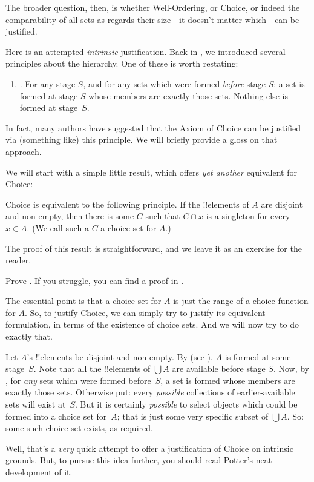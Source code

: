 \documentclass[../../../include/open-logic-section]{subfiles}
\begin{document}

The broader question, then, is whether Well-Ordering, or Choice, or
indeed the comparability of all sets as regards their size---it
doesn't matter which---can be justified. 

Here is an attempted \emph{intrinsic} justification. Back in
, we introduced several principles
about the hierarchy. One of these is worth restating:
\begin{enumerate}
	\item[] \stagesacc. For any stage $S$, and for any sets which were
	formed \emph{before} stage $S$: a set is formed at stage $S$ whose
	members are exactly those sets. Nothing else is formed at
	stage~$S$. 
\end{enumerate}
In fact, many authors have suggested that the Axiom of Choice can be
justified via (something like) this principle. We will briefly provide
a gloss on that approach.

We will start with a simple little result, which offers \emph{yet
another} equivalent for Choice:

\begin{thm}[in $\ZF$]
Choice is equivalent to the following principle. If the !!{element}s
of $A$ are disjoint and non-empty, then there is some $C$ such that $C
\cap x$ is a singleton for every $x \in A$. (We call such a $C$ a
{choice set} for $A$.)
\end{thm}

The proof of this result is straightforward, and we leave it as an
exercise for the reader. 

\begin{prob}
Prove . If you struggle,
you can find a proof in \cite[pp.~242--3]{Potter2004}.
\end{prob}

The essential point is that a choice set for $A$ is just the range of
a choice function for $A$. So, to justify Choice, we can simply try to
justify its equivalent formulation, in terms of the existence of
choice sets. And we will now try to do exactly that. 

Let $A$'s !!{element}s be disjoint and non-empty. By \stageshier{}
(see ), $A$ is formed at some stage~$S$. Note
that all the !!{element}s of $\bigcup A$ are available before stage
$S$. Now, by \stagesacc{}, for \emph{any} sets which were formed
before~$S$, a set is formed whose members are exactly those sets.
Otherwise put: every \emph{possible} collections of earlier-available
sets will exist at~$S$. But it is certainly \emph{possible} to select
objects which could be formed into a choice set for~$A$; that is just
some very specific subset of $\bigcup A$. So: some such choice set
exists, as required.

Well, that's a \emph{very} quick attempt to offer a justification of
Choice on intrinsic grounds. But, to pursue this idea further, you
should read Potter's \cite[\S14.8]{Potter2004} neat development of it.
\end{document}
